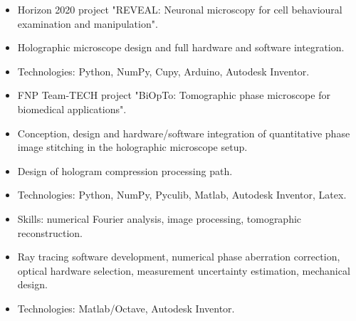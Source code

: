 \documentclass[10pt,a4paper,ragged2e,withhyper]{altacv}
\begin{document}
\begin{paracol}{2}


\begin{itemize}
\item Horizon 2020 project "REVEAL: Neuronal microscopy for cell behavioural examination and manipulation".
\item Holographic microscope design and full hardware and software integration.
\item Technologies: Python, NumPy, Cupy, Arduino, Autodesk Inventor.
\end{itemize}

\divider

\begin{itemize}
\item FNP Team-TECH project "BiOpTo: Tomographic phase microscope for biomedical applications".
\item Conception, design and hardware/software integration of quantitative phase image stitching in the holographic microscope setup.
\item Design of hologram compression processing path.
\item Technologies: Python, NumPy, Pyculib, Matlab, Autodesk Inventor, Latex.
\item Skills: numerical Fourier analysis, image processing, tomographic reconstruction.
\end{itemize}

\divider

\begin{itemize}
\item Ray tracing software development, numerical phase aberration correction, optical hardware selection, measurement uncertainty estimation, mechanical design.
\item Technologies: Matlab/Octave, Autodesk Inventor.
\end{itemize}

\divider



\end{paracol}
\end{document}
